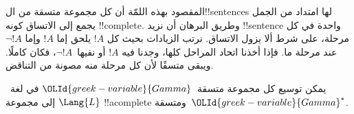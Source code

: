 \documentclass[../../../include/open-logic-section]{subfiles}
\begin{document}
      {}
      {}


\begin{explain}
المقصود بهذه اللمّة أن كل مجموعة متسقة من ال!!{sentence}s لها امتداد
من الجمل يجمع إلى الاتساق كونه !!{complete}. وطريق البرهان أن نزيد
!!{sentence} واحدة في كل مرحلة، على شرط ألا يزول الاتساق. نرتب
الزيادات بحيث كل $!A$ يلحق إما $!A$ وإما $\lnot !A$ عند مرحلة ما.
فإذا أخذنا اتحاد المراحل كلها، وجدنا فيه $!A$ أو نفيها~$\lnot !A$،
فكان كاملًا. ويبقى متسقًا لأن كل مرحلة منه مصونة من التناقض.
\end{explain}

\begin{lem}[لمّة ليندنبوم]
 يمكن توسيع كل مجموعة متسقة~${\OLId{greek-variable}{Gamma}}$ في
لغة~$\Lang{L}$ إلى مجموعة !!a{complete} ومتسقة~${\OLId{greek-variable}{Gamma}}^*$.
\end{lem}
\end{document}
